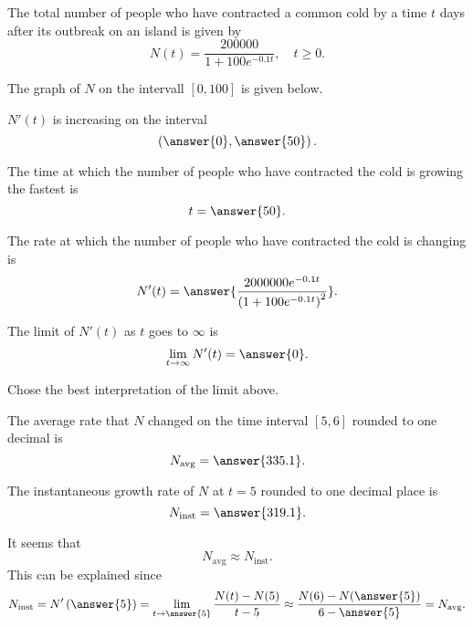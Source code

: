 \documentclass{ximera}
\author{Nela Lakos \and Kyle Parsons}
\begin{document}
\begin{exercise}

The total number of people who have contracted a common cold by a time $t$ days after its outbreak on an island is given by
\[
N(t) = \frac{200000}{1+100e^{-0.1t}},\quad t\geq0.
\]

The graph of $N$ on the intervall $[0,100]$ is given below.

\begin{image}
\end{image}

$N'(t)$ is increasing on the interval
\[
\left(\answer{0},\answer{50}\right).
\]

The time at which the number of people who have contracted the cold is growing the fastest is
\[
t = \answer{50}.
\]

The rate at which the number of people who have contracted the cold is changing is
\[
N'(t) = \answer{\frac{2000000e^{-0.1t}}{\left(1+100e^{-0.1t}\right)^2}}.
\]

The limit of $N'(t)$ as $t$ goes to $\infty$ is
\[
\lim_{t\to\infty}N'(t) = \answer{0}.
\]

Chose the best interpretation of the limit above.
\begin{multipleChoice}
\end{multipleChoice}

The average rate that $N$ changed on the time interval $[5,6]$ rounded to one decimal is
\[
N_{\text{avg}} = \answer{335.1}.
\]

The instantaneous growth rate of $N$ at $t=5$ rounded to one decimal place is
\[
N_{\text{inst}} = \answer{319.1}.
\]

It seems that 
\[
N_{\text{avg}}\approx N_{\text{inst}}.
\]
This can be explained since
\[
N_{\text{inst}} = N'\left(\answer{5}\right) = \lim_{t\to\answer{5}}\frac{N(t)-N(5)}{t-5} \approx \frac{N(6) - N(\answer{5})}{6-\answer{5}} = N_{\text{avg}}.
\]

\end{exercise}
\end{document}
